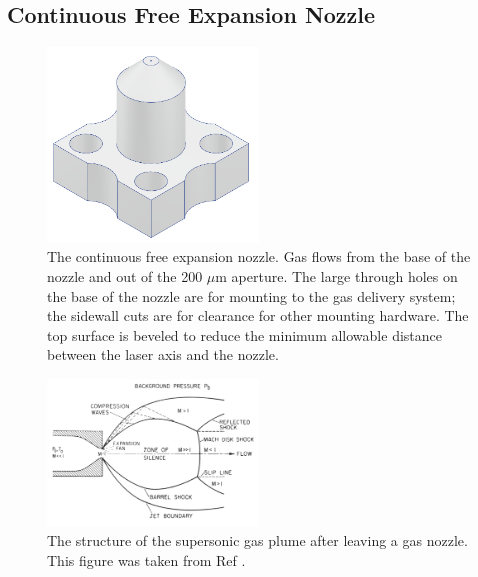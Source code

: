 \subsection{Continuous Free Expansion Nozzle}
%
\begin{figure}
	\centering
	\includegraphics[width=0.5\textwidth]{figures/chap2/gas_nozzle.png}
	\caption{The continuous free expansion nozzle. Gas flows from the base of the nozzle and out of the 200 $\mu$m aperture. The large through holes on the base of the nozzle are for mounting to the gas delivery system; the sidewall cuts are for clearance for other mounting hardware. The top surface is beveled to reduce the minimum allowable distance between the laser axis and the nozzle.}
	\label{fig:gas_nozzle}
\end{figure}

\begin{figure}
	\centering
	\includegraphics[width=0.5\textwidth]{figures/chap2/gas_expansion.PNG}
	\caption{The structure of the supersonic gas plume after leaving a gas nozzle. This figure was taken from Ref \cite{millerFreeJetSources1988}.}
	\label{fig:gas_expansion}
\end{figure}

